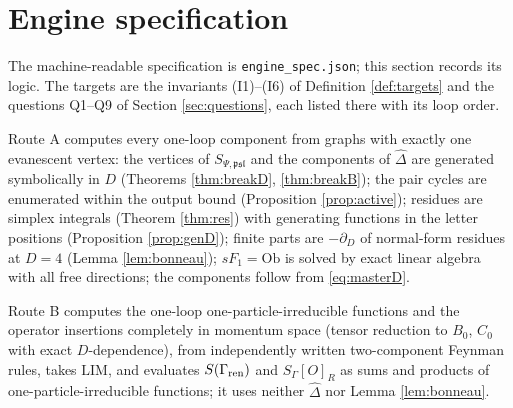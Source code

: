 
\section{Engine specification}
\label{sec:engines}

The machine-readable specification is \texttt{engine\_spec.json}; this section records its logic. The targets are the invariants (I1)--(I6) of Definition \ref{def:targets} and the questions Q1--Q9 of Section \ref{sec:questions}, each listed there with its loop order.

\begin{definition}
\label{def:routeA}
Route A computes every one-loop component from graphs with exactly one evanescent vertex: the vertices of $S_{\Psi,\mathfrak{psl}}$ and the components of $\widehat\Delta$ are generated symbolically in $D$ (Theorems \ref{thm:breakD}, \ref{thm:breakB}); the pair cycles are enumerated within the output bound (Proposition \ref{prop:active}); residues are simplex integrals (Theorem \ref{thm:res}) with generating functions in the letter positions (Proposition \ref{prop:genD}); finite parts are $-\partial_D$ of normal-form residues at $D=4$ (Lemma \ref{lem:bonneau}); $sF_1=\mathrm{Ob}$ is solved by exact linear algebra with all free directions; the components follow from \eqref{eq:masterD}.
\end{definition}

\begin{definition}
\label{def:routeB}
Route B computes the one-loop one-particle-irreducible functions and the operator insertions completely in momentum space (tensor reduction to $B_0$, $C_0$ with exact $D$-dependence), from independently written two-component Feynman rules, takes $\mathrm{LIM}$, and evaluates $S(\Gamma_{\rm ren})$ and $S_\Gamma[O]_R$ as sums and products of one-particle-irreducible functions; it uses neither $\widehat\Delta$ nor Lemma \ref{lem:bonneau}.
\end{definition}

